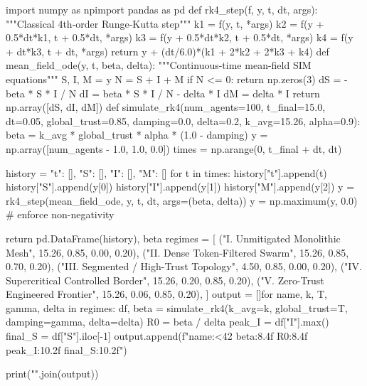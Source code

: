 import numpy as npimport pandas as pd
def rk4_step(f, y, t, dt, args):
    """Classical 4th-order Runge-Kutta step"""
    k1 = f(y, t, *args)
    k2 = f(y + 0.5*dt*k1, t + 0.5*dt, *args)
    k3 = f(y + 0.5*dt*k2, t + 0.5*dt, *args)
    k4 = f(y + dt*k3, t + dt, *args)
    return y + (dt/6.0)*(k1 + 2*k2 + 2*k3 + k4)
def mean_field_ode(y, t, beta, delta):
    """Continuous-time mean-field SIM equations"""
    S, I, M = y
    N = S + I + M
    if N <= 0:
        return np.zeros(3)
    dS = -beta * S * I / N
    dI =  beta * S * I / N - delta * I
    dM =  delta * I
    return np.array([dS, dI, dM])
def simulate_rk4(num_agents=100, t_final=15.0, dt=0.05,
                 global_trust=0.85, damping=0.0, delta=0.2,
                 k_avg=15.26, alpha=0.9):
    beta = k_avg * global_trust * alpha * (1.0 - damping)
    y = np.array([num_agents - 1.0, 1.0, 0.0])
    times = np.arange(0, t_final + dt, dt)
    
    history = {"t": [], "S": [], "I": [], "M": []}
    for t in times:
        history["t"].append(t)
        history["S"].append(y[0])
        history["I"].append(y[1])
        history["M"].append(y[2])
        y = rk4_step(mean_field_ode, y, t, dt, args=(beta, delta))
        y = np.maximum(y, 0.0)  # enforce non-negativity
    
    return pd.DataFrame(history), beta
regimes = [
    ("I.   Unmitigated Monolithic Mesh",       15.26, 0.85, 0.00, 0.20),
    ("II.  Dense Token-Filtered Swarm",        15.26, 0.85, 0.70, 0.20),
    ("III. Segmented / High-Trust Topology",    4.50, 0.85, 0.00, 0.20),
    ("IV.  Supercritical Controlled Border",   15.26, 0.20, 0.85, 0.20),
    ("V.   Zero-Trust Engineered Frontier",    15.26, 0.06, 0.85, 0.20),
]
output = []for name, k, T, gamma, delta in regimes:
    df, beta = simulate_rk4(k_avg=k, global_trust=T, damping=gamma, delta=delta)
    R0 = beta / delta
    peak_I = df["I"].max()
    final_S = df["S"].iloc[-1]
    output.append(f"{name:<42} {beta:8.4f} {R0:8.4f} {peak_I:10.2f} {final_S:10.2f}")

print("\n".join(output))


